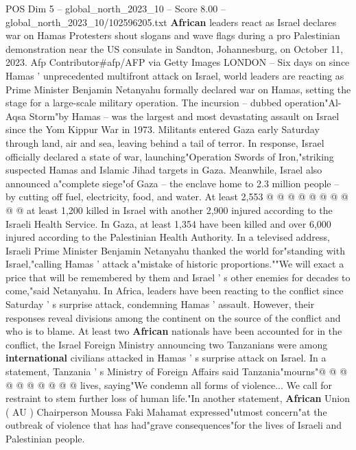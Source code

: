 \begin{textsample}{POS Dim 5 – global\_north\_2023\_10 – Score 8.00 – global\_north\_2023\_10/102596205.txt}  \label{ex:f5_pos_434}
\textbf{African} leaders react as Israel declares war on Hamas Protesters shout slogans and wave flags during a pro Palestinian demonstration near the US consulate in Sandton, Johannesburg, on October 11, 2023.
Afp Contributor\#afp/AFP via Getty Images LONDON -- Six days on since Hamas ' unprecedented multifront attack on Israel, world leaders are reacting as Prime Minister Benjamin Netanyahu formally declared war on Hamas, setting the stage for a large-scale military operation.
The incursion -- dubbed operation"Al-Aqsa Storm"by Hamas -- was the largest and most devastating assault on Israel since the Yom Kippur War in 1973.
Militants entered Gaza early Saturday through land, air and sea, leaving behind a tail of terror.
In response, Israel officially declared a state of war, launching"Operation Swords of Iron,"striking suspected Hamas and Islamic Jihad targets in Gaza.
Meanwhile, Israel also announced a"complete siege"of Gaza -- the enclave home to 2.3 million people -- by cutting off fuel, electricity, food, and water.
At least 2,553 @ @ @ @ @ @ @ @ @ @ at least 1,200 killed in Israel with another 2,900 injured according to the Israeli Health Service.
In Gaza, at least 1,354 have been killed and over 6,000 injured according to the Palestinian Health Authority.
In a televised address, Israeli Prime Minister Benjamin Netanyahu thanked the world for"standing with Israel,"calling Hamas ' attack a"mistake of historic proportions.""We will exact a price that will be remembered by them and Israel ' s other enemies for decades to come,"said Netanyahu.
In Africa, leaders have been reacting to the conflict since Saturday ' s surprise attack, condemning Hamas ' assault.
However, their responses reveal divisions among the continent on the source of the conflict and who is to blame.
At least two \textbf{African} nationals have been accounted for in the conflict, the Israel Foreign Ministry announcing two Tanzanians were among \textbf{international} civilians attacked in Hamas ' s surprise attack on Israel.
In a statement, Tanzania ' s Ministry of Foreign Affairs said Tanzania"mourns"@ @ @ @ @ @ @ @ @ @ lives, saying"We condemn all forms of violence...
We call for restraint to stem further loss of human life."In another statement, \textbf{African} Union ( AU ) Chairperson Moussa Faki Mahamat expressed"utmost concern"at the outbreak of violence that has had"grave consequences"for the lives of Israeli and Palestinian people.

\end{textsample}
